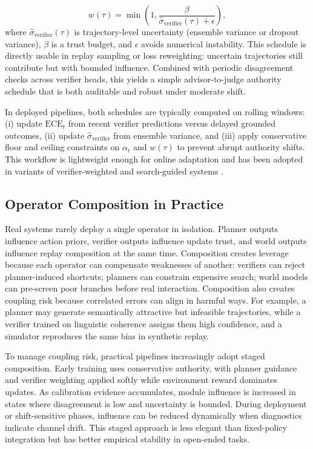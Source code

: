 \documentclass[pdflatex,sn-mathphys-num]{sn-jnl}
\begin{document}
\begin{equation}
w(\tau)=\min\!\left(1,\frac{\beta}{\hat{\sigma}_{\text{verifier}}(\tau)+\epsilon}\right),
\label{eq:weight_recipe}
\end{equation}
where $\hat{\sigma}_{\text{verifier}}(\tau)$ is trajectory-level uncertainty (ensemble variance or dropout variance), $\beta$ is a trust budget, and $\epsilon$ avoids numerical instability. This schedule is directly usable in replay sampling or loss reweighting: uncertain trajectories still contribute but with bounded influence. Combined with periodic disagreement checks across verifier heads, this yields a simple advisor-to-judge authority schedule that is both auditable and robust under moderate shift.

In deployed pipelines, both schedules are typically computed on rolling windows: (i) update $\mathrm{ECE}_t$ from recent verifier predictions versus delayed grounded outcomes, (ii) update $\hat{\sigma}_{\text{verifier}}$ from ensemble variance, and (iii) apply conservative floor and ceiling constraints on $\alpha_t$ and $w(\tau)$ to prevent abrupt authority shifts. This workflow is lightweight enough for online adaptation and has been adopted in variants of verifier-weighted and search-guided systems \cite{arxiv_p_2602_06493,arxiv_p_2602_12579,arxiv_p_2602_07848,arxiv_p_2602_02395}.

\subsection{Operator Composition in Practice}
Real systems rarely deploy a single operator in isolation. Planner outputs influence action priors, verifier outputs influence update trust, and world outputs influence replay composition at the same time. Composition creates leverage because each operator can compensate weaknesses of another: verifiers can reject planner-induced shortcuts; planners can constrain expensive search; world models can pre-screen poor branches before real interaction. Composition also creates coupling risk because correlated errors can align in harmful ways. For example, a planner may generate semantically attractive but infeasible trajectories, while a verifier trained on linguistic coherence assigns them high confidence, and a simulator reproduces the same bias in synthetic replay.

To manage coupling risk, practical pipelines increasingly adopt staged composition. Early training uses conservative authority, with planner guidance and verifier weighting applied softly while environment reward dominates updates. As calibration evidence accumulates, module influence is increased in states where disagreement is low and uncertainty is bounded. During deployment or shift-sensitive phases, influence can be reduced dynamically when diagnostics indicate channel drift. This staged approach is less elegant than fixed-policy integration but has better empirical stability in open-ended tasks.
\end{document}
